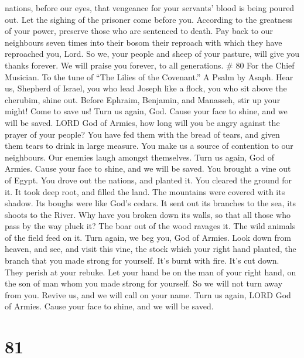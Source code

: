 nations, before our eyes, that vengeance for your servants' blood is
being poured out.  Let the sighing of the prisoner come
before you. According to the greatness of your power, preserve those who
are sentenced to death.  Pay back to our neighbours seven
times into their bosom their reproach with which they have reproached
you, Lord.  So we, your people and sheep of your pasture,
will give you thanks forever. We will praise you forever, to all
generations. \# 80 For the Chief Musician. To the tune of ``The Lilies
of the Covenant.'' A Psalm by Asaph.  Hear us, Shepherd of
Israel, you who lead Joseph like a flock, you who sit above the
cherubim, shine out.  Before Ephraim, Benjamin, and
Manasseh, stir up your might! Come to save us!  Turn us
again, God. Cause your face to shine, and we will be saved. 
LORD God of Armies, how long will you be angry against the prayer of
your people?  You have fed them with the bread of tears, and
given them tears to drink in large measure.  You make us a
source of contention to our neighbours. Our enemies laugh amongst
themselves.  Turn us again, God of Armies. Cause your face
to shine, and we will be saved.  You brought a vine out of
Egypt. You drove out the nations, and planted it.  You
cleared the ground for it. It took deep root, and filled the land.
 The mountains were covered with its shadow. Its boughs
were like God's cedars.  It sent out its branches to the
sea, its shoots to the River.  Why have you broken down its
walls, so that all those who pass by the way pluck it?  The
boar out of the wood ravages it. The wild animals of the field feed on
it.  Turn again, we beg you, God of Armies. Look down from
heaven, and see, and visit this vine,  the stock which your
right hand planted, the branch that you made strong for yourself.
 It's burnt with fire. It's cut down. They perish at your
rebuke.  Let your hand be on the man of your right hand, on
the son of man whom you made strong for yourself.  So we
will not turn away from you. Revive us, and we will call on your name.
 Turn us again, LORD God of Armies. Cause your face to
shine, and we will be saved.

\hypertarget{section-71}{%
\section{81}\label{section-71}}

